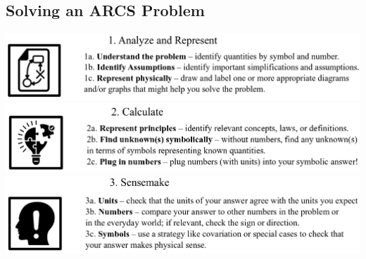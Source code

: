 \documentclass[]{article}
\begin{document}
\begin{PresentSpace}
\section*{Solving an ARCS Problem}
\begin{center}
	\includegraphics[scale=0.4]{AnalyzeAndRepresent}
	\includegraphics[scale=0.4]{Calculate}
	\includegraphics[scale=0.4]{Sensemake}
\end{center}
\end{PresentSpace}
\newpage
\end{document}

